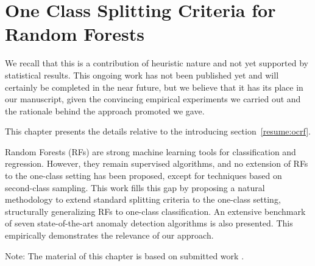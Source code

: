\chapter{One Class Splitting Criteria for Random Forests}
\label{chap:ocrf}

We recall that this is a contribution of heuristic nature and not yet supported by statistical results. This ongoing work has not been published yet and will certainly be completed in the near future, but we believe that it has its place in our manuscript, given the convincing empirical experiments we carried out and the rationale behind the approach promoted we gave.

\begin{chapabstract}
This chapter presents the details relative to the introducing section~\ref{resume:ocrf}.

Random Forests (RFs) are strong machine learning tools for classification and regression. However, they remain supervised algorithms, and no extension of RFs to the one-class setting has been proposed, except for techniques based on second-class sampling.
This work fills this gap by proposing a natural methodology to extend standard splitting criteria to the one-class setting, structurally generalizing RFs to one-class classification.
An extensive benchmark of seven state-of-the-art anomaly detection algorithms is also presented. This empirically demonstrates the relevance of our approach.
\end{chapabstract}

Note: The material of this chapter is based on submitted work \citep{OCRF16}.


